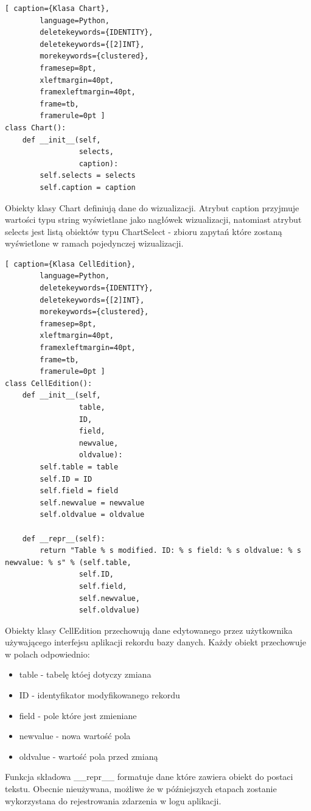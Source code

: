 \documentclass[a4paper,10pt, twoside]{report}
\begin{document}
\begin{minipage}{\textwidth}
    \begin{lstlisting}[ caption={Klasa Chart},
        language=Python,
        deletekeywords={IDENTITY},
        deletekeywords={[2]INT},
        morekeywords={clustered},
        framesep=8pt,
        xleftmargin=40pt,
        framexleftmargin=40pt,
        frame=tb,
        framerule=0pt ]
class Chart():
    def __init__(self,
                 selects,
                 caption):
        self.selects = selects
        self.caption = caption
    \end{lstlisting}
{Obiekty klasy Chart definiują dane do wizualizacji. Atrybut caption przyjmuje 
wartości typu string wyświetlane jako nagłówek wizualizacji, natomiast atrybut 
selects jest listą obiektów typu ChartSelect - zbioru zapytań które zostaną 
wyświetlone w ramach pojedynczej wizualizacji.}
\end{minipage}

\begin{minipage}{\textwidth}
    \begin{lstlisting}[ caption={Klasa CellEdition},
        language=Python,
        deletekeywords={IDENTITY},
        deletekeywords={[2]INT},
        morekeywords={clustered},
        framesep=8pt,
        xleftmargin=40pt,
        framexleftmargin=40pt,
        frame=tb,
        framerule=0pt ]
class CellEdition():
    def __init__(self,
                 table, 
                 ID, 
                 field, 
                 newvalue,
                 oldvalue): 
        self.table = table
        self.ID = ID
        self.field = field
        self.newvalue = newvalue
        self.oldvalue = oldvalue

    def __repr__(self): 
        return "Table % s modified. ID: % s field: % s oldvalue: % s newvalue: % s" % (self.table, 
                 self.ID, 
                 self.field, 
                 self.newvalue,
                 self.oldvalue)
    \end{lstlisting}
{Obiekty klasy CellEdition przechowują dane edytowanego przez użytkownika 
używającego interfejsu aplikacji rekordu bazy danych. Każdy obiekt przechowuje w
 polach odpowiednio:}
\begin{itemize}
    \item table - tabelę któej dotyczy zmiana
    \item ID - identyfikator modyfikowanego rekordu
    \item field - pole które jest zmieniane
    \item newvalue - nowa wartość pola
    \item oldvalue - wartość pola przed zmianą
\end{itemize}
{Funkcja składowa \_\_repr\_\_ formatuje dane które zawiera obiekt do postaci 
tekstu. Obecnie nieużywana, możliwe że w późniejszych etapach zostanie 
wykorzystana do rejestrowania zdarzenia w logu aplikacji.}
\end{minipage}
\end{document}

